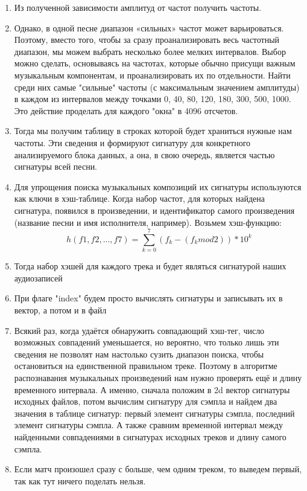 \documentclass[12pt]{article}
\begin{document}
    \begin{enumerate}
        \item Из полученной зависимости амплитуд от частот получить частоты.
        \item Однако, в одной песне диапазон «сильных» частот может варьироваться. Поэтому, вместо того, чтобы за сразу проанализировать весь частотный диапазон, мы можем выбрать несколько более мелких интервалов. Выбор можно сделать, основываясь на частотах, которые обычно присущи важным музыкальным компонентам, и проанализировать их по отдельности. Найти среди них самые "сильные" частоты (с максимальным значением амплитуды) в каждом из интервалов между точками 0, 40, 80, 120, 180, 300, 500, 1000. Это действие проделать для каждого "окна" в 4096 отсчетов. 
        \item Тогда мы получим таблицу в строках которой будет храниться нужные нам частоты. Эти сведения и формируют сигнатуру для конкретного анализируемого блока данных, а она, в свою очередь, является частью сигнатуры всей песни.
        \item Для упрощения поиска музыкальных композиций их сигнатуры используются как ключи в хэш-таблице. Когда набор частот, для которых найдена сигнатура, появился в произведении, и идентификатор самого произведения (название песни и имя исполнителя, например). Возьмем хэш-функцию: $$h(f1, f2, ... , f7) = \sum_{k=0}^7 {(f_k - (f_k mod 2)) * 10^k}$$
        \item Тогда набор хэшей для каждого трека и будет являться сигнатурой наших аудиозаписей
        \item При флаге "index" будем просто вычислять сигнатуры и записывать их в вектор, а потом и в файл
        \item Всякий раз, когда удаётся обнаружить совпадающий хэш-тег, число возможных совпадений уменьшается, но вероятно, что только лишь эти сведения не позволят нам настолько сузить диапазон поиска, чтобы остановиться на единственной правильном треке. Поэтому в алгоритме распознавания музыкальных произведений нам нужно проверять ещё и длину временного интервала. А именно, сначала положим в 2d вектор сигнатуры исходных файлов, потом вычислим сигнатуру для сэмпла и найдем два значения в таблице сигнатур: первый элемент сигнатуры сэмпла, последний элемент сигнатуры сэмпла. А также сравним временной интервал между найденными совпадениями в сигнатурах исходных треков и длину самого сэмпла.
        \item Если матч произошел сразу с больше, чем одним треком, то выведем первый, так как тут ничего поделать нельзя.
        
    \end{enumerate}
\end{document}
